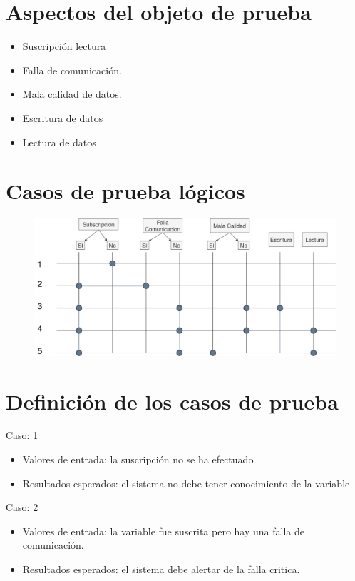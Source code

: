 \documentclass[]{scrreprt}
\begin{document}
\section{Aspectos del objeto de prueba}

\begin{itemize}
	\item Suscripción lectura
	\item Falla de comunicación.
	\item Mala calidad de datos.
	\item Escritura de datos
	\item Lectura de datos
\end{itemize}
	
\section{Casos de prueba lógicos}

\begin{figure}[H]
  \centering
  \vspace{1cm} 
  \includegraphics[width=1.15\textwidth]{CTM.png}
  \vspace{1cm} 
\end{figure}

\section{Definición de los casos de prueba}

Caso: 1
\begin{itemize}
	\item Valores de entrada: la suscripción no se ha efectuado
	\item Resultados esperados: el sistema no debe tener conocimiento de la variable 
\end{itemize}

Caso: 2
\begin{itemize}
	\item Valores de entrada: la variable fue suscrita pero hay una falla de comunicación.
	\item Resultados esperados: el sistema debe alertar de la falla critica.
\end{itemize}
\end{document}
